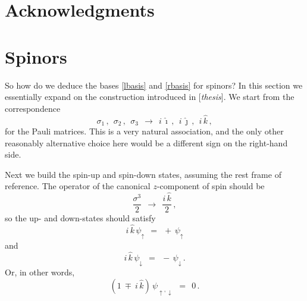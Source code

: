 \documentclass[epsfig,12pt]{article}
\newcommand{\ii}{\hat\imath}
\newcommand{\jj}{\hat\jmath}
\newcommand{\kk}{\hat k}
\begin{document}
\section*{Acknowledgments}




\pagebreak
\appendix
\setcounter{equation}{0}


\section{Spinors}
\label{section-spinors}

	So how do we deduce the bases \eqref{lbasis} and \eqref{rbasis} for spinors?
	In this section we essentially expand on the construction introduced in [\emph{thesis}].
	We start from the correspondence
\begin{equation}
	\sigma_1\,,~~ \sigma_2\,,~~ \sigma_3	~~\to~~		i\,\ii\,,~~ i\,\jj\,,~~ i\,\kk\,,
\end{equation}
	for the Pauli matrices.
	This is a very natural association, and the only other reasonably alternative choice here
	would be a different sign on the right-hand side.

        Next we build the spin-up and spin-down states, assuming the rest frame of reference.
	The operator of the canonical $ z $-component of spin should be
\[
	\frac{\sigma^3} 2	~~\to~~		\frac{i\,\kk} 2\,,	
\]
	so the up- and down-states should satisfy
\begin{equation}
	i\,\kk\, \psi_\uparrow	~~=~~		+\,\psi_\uparrow
\end{equation}
	and
\begin{equation}
	i\,\kk\, \psi_\downarrow	~~=~~		-\,\psi_\downarrow\,.
\end{equation}
	Or, in other words,
\begin{equation}
\label{updown}
	(1 ~\mp~ i\,\kk)\, \psi_{\uparrow,\downarrow}	~~=~~	0\,.
\end{equation}
\end{document}
